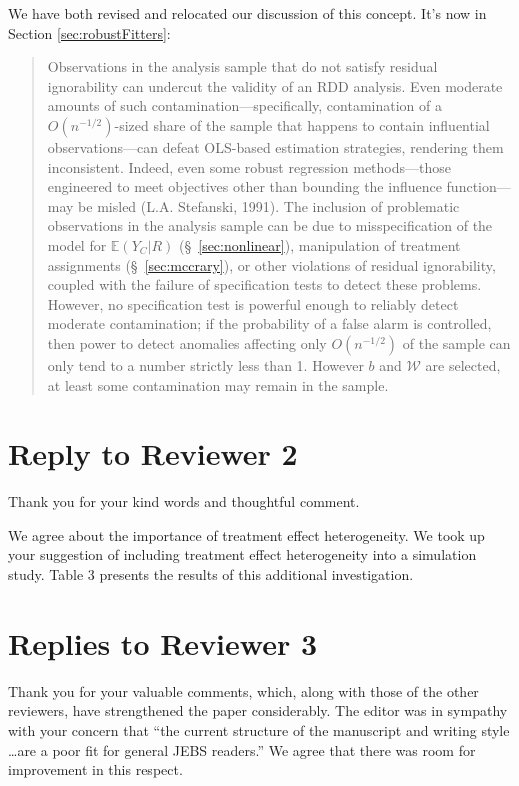 \documentclass[12pt]{article}
\newcommand{\EE}{\mathbb{E}}
\begin{document}
\begin{itemize}
\begin{itemize}
   We have both revised and relocated our discussion of this
   concept.  It's now in Section \ref{sec:robustFitters}:
   \begin{quote}
Observations in the analysis sample that do not satisfy residual
ignorability %
 can undercut the validity of an RDD analysis.
Even moderate amounts of such contamination---specifically, contamination of
a $O(n^{-1/2})$-sized
share of the sample that happens to contain influential
observations---can defeat OLS-based estimation strategies, rendering
them inconsistent.
Indeed, even some robust regression methods---those engineered to meet
objectives other than bounding the influence function---may be misled
(L.A. Stefanski, 1991).
The inclusion of problematic observations in the analysis sample can
be due to misspecification of the model for $\EE (Y_{C}|R)$
(\S~\ref{sec:nonlinear}), manipulation of treatment assignments
(\S~\ref{sec:mccrary}), or other violations of residual ignorability,
coupled with the failure of specification tests to detect these problems.
However, no specification test is powerful enough
to reliably detect moderate contamination; if the probability of a 
false alarm is controlled, then power to detect anomalies
affecting only $O(n^{-1/2})$ of the sample can only tend to a number
strictly less than 1.
However $b$ and $\mathcal{W}$ are selected, at least some
contamination may remain in the sample.
   \end{quote}
   
\end{itemize}
\end{itemize}

\section{Reply to Reviewer 2}

Thank you for your kind words and thoughtful comment. 

We agree about the importance of treatment effect heterogeneity.
We took up your suggestion of
including treatment effect heterogeneity into a simulation study. 
 Table 3 presents the results of this additional investigation. 




\section{Replies to Reviewer 3}
Thank you for your valuable comments, which, along with those of the
other reviewers, have strengthened the paper considerably. The editor 
was in sympathy with your concern that ``the current structure of the manuscript
and writing style \dots are a poor fit for general JEBS readers.'' 
We agree that there was room for improvement in this respect.
\end{document}
